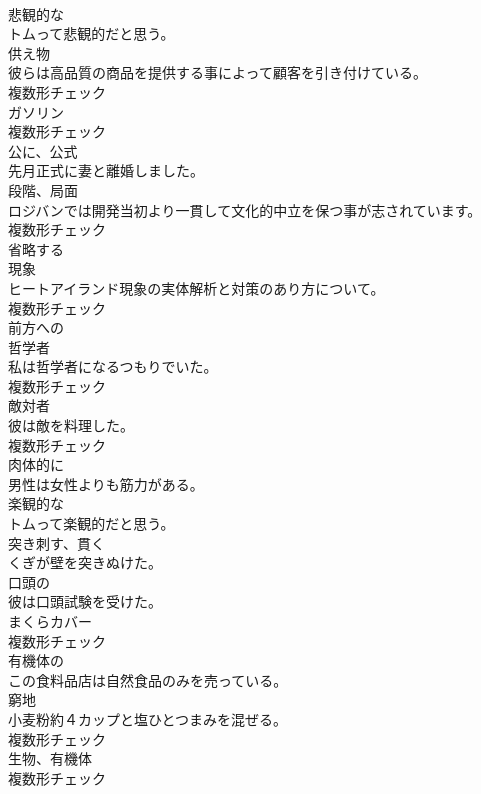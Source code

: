 \documentclass[8pt]{extreport}
\begin{document}
\begin{CJK}{UTF8}{min}
\\	[形容詞]	悲観的な	
\\	トムって悲観的だと思う。	
\\	[名詞]	供え物	
\\	彼らは高品質の商品を提供する事によって顧客を引き付けている。	
\\	複数形チェック
\\	[名詞]	ガソリン	
\\	複数形チェック
\\	[副詞]	公に、公式	
\\	先月正式に妻と離婚しました。	
\\	[名詞]	段階、局面	
\\	ロジバンでは開発当初より一貫して文化的中立を保つ事が志されています。	
\\	複数形チェック
\\	[動詞]	省略する	
\\	[名詞]	現象	
\\	ヒートアイランド現象の実体解析と対策のあり方について。	
\\	複数形チェック
\\	[形容詞]	前方への	
\\	[名詞]	哲学者	
\\	私は哲学者になるつもりでいた。	
\\	複数形チェック
\\	[名詞]	敵対者	
\\	彼は敵を料理した。	
\\	複数形チェック
\\	[副詞]	肉体的に	
\\	男性は女性よりも筋力がある。	
\\	[形容詞]	楽観的な	
\\	トムって楽観的だと思う。	
\\	[動詞]	突き刺す、貫く	
\\	くぎが壁を突きぬけた。	
\\	[形容詞]	口頭の	
\\	彼は口頭試験を受けた。	
\\	[名詞]	まくらカバー	
\\	複数形チェック
\\	[形容詞]	有機体の	
\\	この食料品店は自然食品のみを売っている。	
\\	[名詞]	窮地	
\\	小麦粉約４カップと塩ひとつまみを混ぜる。	
\\	複数形チェック
\\	[名詞]	生物、有機体	
\\	複数形チェック

\end{CJK}
\end{document}
